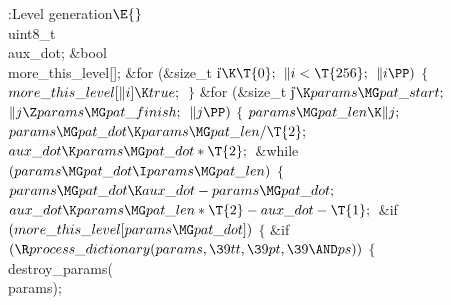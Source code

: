 \Y\B\4:Level generation\X${}\E{}$\6
\\{uint8\_t}\\{aux\_dot};\7
\&{bool} \\{more\_this\_level}[];\7
\&{for} (\&{size\_t} \|i${}\K\T{0};{}$ ${}\|i<\T{256};{}$ ${}\|i\PP){}$\5
${}\{{}$\1\6
${}\\{more\_this\_level}[\|i]\K\\{true};{}$\6
\4${}\}{}$\2\6
\&{for} (\&{size\_t} \|j${}\K\\{params}\MG\\{pat\_start};{}$ ${}\|j\Z\\{params}%
\MG\\{pat\_finish};{}$ ${}\|j\PP){}$\5
${}\{{}$\1\6
${}\\{params}\MG\\{pat\_len}\K\|j;{}$\6
${}\\{params}\MG\\{pat\_dot}\K\\{params}\MG\\{pat\_len}/\T{2};{}$\6
${}\\{aux\_dot}\K\\{params}\MG\\{pat\_dot}*\T{2};{}$\6
\&{while} ${}(\\{params}\MG\\{pat\_dot}\I\\{params}\MG\\{pat\_len}){}$\5
${}\{{}$\1\6
${}\\{params}\MG\\{pat\_dot}\K\\{aux\_dot}-\\{params}\MG\\{pat\_dot};{}$\6
${}\\{aux\_dot}\K\\{params}\MG\\{pat\_len}*\T{2}-\\{aux\_dot}-\T{1};{}$\6
\&{if} ${}(\\{more\_this\_level}[\\{params}\MG\\{pat\_dot}]){}$\5
${}\{{}$\1\6
\&{if} ${}(\R\\{process\_dictionary}(\\{params},\39\\{tt},\39\\{pt},\39{\AND}%
\\{ps})){}$\5
${}\{{}$\1\6
\\{destroy\_params}(\\{params});\6
